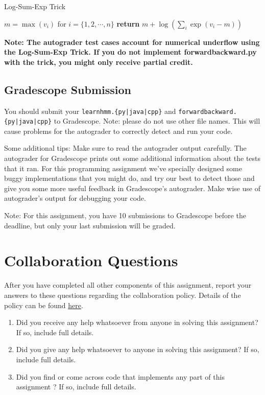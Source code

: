 \documentclass[11pt,addpoints,answers]{exam}
\begin{document}
\begin{algorithm}[H]
    \caption{Log-Sum-Exp Trick}
    \label{alg:log-sum-exp-trick}
    \begin{algorithmic}[1]
            \State $m = \max(v_i)$ for $i=\{1, 2,\cdots, n\}$ 
            \State \textbf{return }{$m + \log(\sum_i\exp(v_i-m))$} 
        \EndProcedure
    \end{algorithmic}
\end{algorithm}

\textbf{Note: The autograder test cases account for numerical underflow using the Log-Sum-Exp Trick. If you do not implement \textbf{forwardbackward.py} with the trick, you might only receive partial credit.}

\vspace{0.2 in}    
\subsection{Gradescope Submission}

You should submit your \texttt{learnhmm.\{py|java|cpp\}} and %
\texttt{forwardbackward.\{py|java|cpp\}} to Gradescope.
Note: please do not use other file names. This will cause problems for the autograder to correctly detect and run your code.

Some additional tips: 
Make sure to read the autograder output carefully. The autograder for Gradescope prints out some additional 
information about the tests that it ran. For this programming assignment we've specially designed some buggy implementations that you might do, and try our best to detect those and give you some more useful feedback in Gradescope's autograder. Make wise use of autograder's output for debugging your code. 


Note: For this assignment, you have 10 submissions to Gradescope before the deadline, but only your last submission will be graded.


\newpage
\section{Collaboration Questions}
After you have completed all other components of this assignment, report your answers to these questions regarding the collaboration policy. Details of the policy can be found \href{http://www.cs.cmu.edu/~mgormley/courses/10601/syllabus.html}{here}.
\begin{enumerate}
    \item Did you receive any help whatsoever from anyone in solving this assignment? If so, include full details.
    \item Did you give any help whatsoever to anyone in solving this assignment? If so, include full details.
    \item Did you find or come across code that implements any part of this assignment ? If so, include full details.
\end{enumerate}

\begin{your_solution}[height=6cm]

\end{your_solution}
\end{document}

